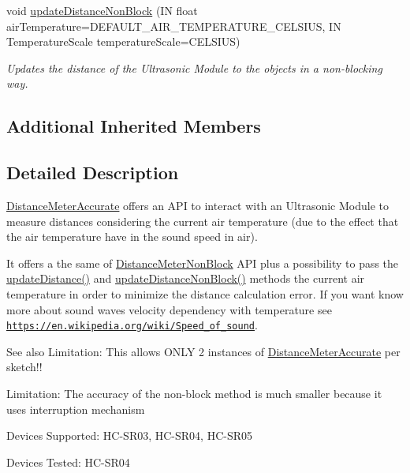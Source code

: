 \begin{DoxyCompactItemize}
void \hyperlink{class_easyuino_1_1_distance_meter_accurate_ac428b0dfd816862fab277b2da1f0c164}{update\+Distance\+Non\+Block} (IN float air\+Temperature=D\+E\+F\+A\+U\+L\+T\+\_\+\+A\+I\+R\+\_\+\+T\+E\+M\+P\+E\+R\+A\+T\+U\+R\+E\+\_\+\+C\+E\+L\+S\+I\+US, IN Temperature\+Scale temperature\+Scale=C\+E\+L\+S\+I\+US)
\begin{DoxyCompactList}\small\item\em Updates the distance of the Ultrasonic Module to the objects in a non-\/blocking way. \end{DoxyCompactList}\end{DoxyCompactItemize}
\subsection*{Additional Inherited Members}


\subsection{Detailed Description}
\hyperlink{class_easyuino_1_1_distance_meter_accurate}{Distance\+Meter\+Accurate} offers an A\+PI to interact with an Ultrasonic Module to measure distances considering the current air temperature (due to the effect that the air temperature have in the sound speed in air). 

It offers a the same of \hyperlink{class_easyuino_1_1_distance_meter_non_block}{Distance\+Meter\+Non\+Block} A\+PI plus a possibility to pass the \hyperlink{class_easyuino_1_1_distance_meter_non_block_a4ea37c6c0562a76cd03636db329743f9}{update\+Distance()} and \hyperlink{class_easyuino_1_1_distance_meter_non_block_ac7163baab744f1393bab3841de0170d4}{update\+Distance\+Non\+Block()} methods the current air temperature in order to minimize the distance calculation error. If you want know more about sound waves velocity dependency with temperature see \href{https://en.wikipedia.org/wiki/Speed_of_sound}{\tt https\+://en.\+wikipedia.\+org/wiki/\+Speed\+\_\+of\+\_\+sound}. \begin{DoxySeeAlso}{See also}
Limitation\+: This allows O\+N\+LY 2 instances of \hyperlink{class_easyuino_1_1_distance_meter_accurate}{Distance\+Meter\+Accurate} per sketch!! 

Limitation\+: The accuracy of the non-\/block method is much smaller because it uses interruption mechanism 

Devices Supported\+: H\+C-\/\+S\+R03, H\+C-\/\+S\+R04, H\+C-\/\+S\+R05 

Devices Tested\+: H\+C-\/\+S\+R04 
\end{DoxySeeAlso}


